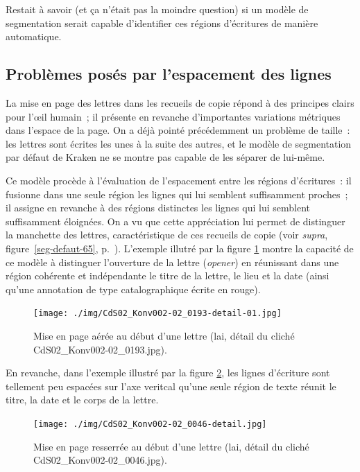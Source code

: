 \documentclass[a4paper,12pt,twoside]{book}
\begin{document}
				Restait à savoir (et ça n'était pas la moindre question) si un modèle de {segmentation} serait capable d'identifier ces régions d'écritures de manière automatique.
    
		    \subsection{Problèmes posés par l'espacement des lignes}
				La mise en page des lettres dans les recueils de copie répond à des principes clairs pour l'œil humain~; il présente en revanche d'importantes variations métriques dans l'espace de la page. On a déjà pointé précédemment un problème de taille~: les lettres sont écrites les unes à la suite des autres, et le modèle de {segmentation} par défaut de Kraken ne se montre pas capable de les séparer de lui-même.
				
				Ce modèle procède à l'évaluation de l'espacement entre les régions d'écritures~: il fusionne dans une seule région les lignes qui lui semblent suffisamment proches~; il assigne en revanche à des régions distinctes les lignes qui lui semblent suffisamment éloignées. On a vu que cette appréciation lui permet de distinguer la manchette des lettres, caractéristique de ces recueils de copie (voir \textit{supra}, figure~\ref{seg-defaut-65}, p.~\pageref{seg-defaut-65}). L'exemple illutré par la figure \ref{seg-opener-193} montre la capacité de ce modèle à distinguer l'ouverture de la lettre (\textit{opener}) en réunissant dans une région cohérente et indépendante le titre de la lettre, le lieu et la date (ainsi qu'une annotation de type catalographique écrite en rouge).
				
				\begin{figure}[!h]
					\centering
					\texttt{[image: ./img/CdS02\_Konv002-02\_0193-detail-01.jpg]}%
					\caption{Mise en page aérée au début d'une lettre (\gls{lai}, détail du cliché CdS02\_Konv002-02\_0193.jpg).}%
					\label{seg-opener-193}
				\end{figure}
			
				En revanche, dans l'exemple illustré par la figure \ref{seg-glob-46}, les lignes d'écriture sont tellement peu espacées sur l'axe veritcal qu'une seule région de texte réunit le titre, la date et le corps de la lettre.
			
				\begin{figure}[!h]
					\centering
					\texttt{[image: ./img/CdS02\_Konv002-02\_0046-detail.jpg]}%
					\caption{Mise en page resserrée au début d'une lettre (\gls{lai}, détail du cliché CdS02\_Konv002-02\_0046.jpg).}%
					\label{seg-glob-46}%
				\end{figure}
				
\end{document}
